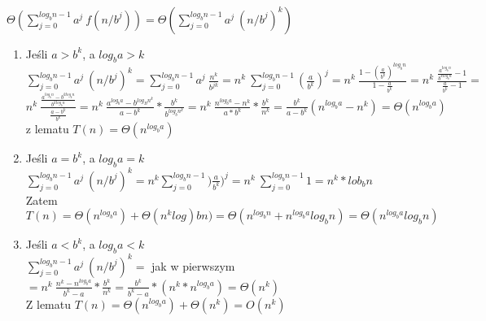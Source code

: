 \\
$\Theta(\sum_{j=0}^{log_bn-1} a^j\ f(n/b^j))=\Theta(\sum_{j=0}^{log_bn-1} a^j\ (n/b^j)^k)$\\
\begin{enumerate}
\item Jeśli $a>b^k$, a $log_ba>k$\\
	$\sum_{j=0}^{log_bn-1} a^j\ (n/b^j)^k = \sum_{j=0}^{log_bn-1} a^j\ \frac{n^k}{b^{jk}}=n^k\ \sum_{j=0}^{log_bn-1} (\frac{a}{b^k})^j = n^k\ \frac{1-(\frac{a}{b^k})^{log_bn}}{1-\frac{a}{b^k}}= n^k\ \frac{\frac{a^{log_bn}}{b^{klog_bn}}-1}{\frac{a}{b^k}-1}=$\\
	$n^k\ \frac{\frac{a^{log_bn}-b^{klog_bn}}{b^{klog_bn}}}{\frac{a-b^k}{b^k}}= n^k\ \frac{a^{log_ba}-b^{log_Bn^k}}{a-b^k} \ast \frac{b^k}{b^{log_bn^k}}= n^k\ \frac{n^{log_ba}-n^k}{a\ast b^k}\ast \frac{b^k}{n^k} = \frac{b^k}{a-b^k}(n^{log_ba}-n^k) = \Theta(n^{log_ba})$\\
	z lematu $T(n) = \Theta(n^{log_ba})$
\item Jeśli $a=b^k$, a $log_ba=k$\\
	$\sum_{j=0}^{log_bn-1} a^j\ (n/b^j)^k = n^k\sum_{j=0}^{log_bn-1} )\frac{a}{b^k})^j = n^k\ \sum_{j=0}^{log_bn-1} 1 = n^k \ast lob_bn$\\
	Zatem $T(n) = \Theta(n^{log_ba}) + \Theta(n^klog)bn) = \Theta(n^{log_bn} + n^{log_ba}log_bn) = \Theta(n^{log_ba}log_bn)$
\item Jeśli $a<b^k$, a $log_ba<k$\\
	$\sum_{j=0}^{log_bn-1} a^j\ (n/b^j)^k = $ jak w pierwszym $ = n^k\ \frac{n^k-n^{log_ba}}{b^k-a} \ast \frac{b^k}{n^k} = \frac{b^k}{b^k-a}\ast (n^k \ast n^{log_ba})=\Theta(n^k)$\\
	Z lematu $T(n) = \Theta(n^{log_ba}) + \Theta(n^k) = O(n^k)$
\end{enumerate}

